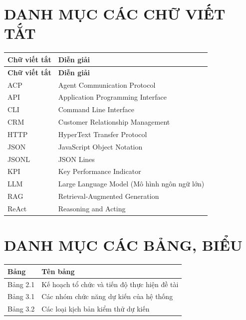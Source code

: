 \documentclass[a4paper]{article}
\begin{document}
\section*{DANH MỤC CÁC CHỮ VIẾT TẮT}
\begin{longtable}{L{0.22\textwidth}L{0.72\textwidth}}
\toprule
\textbf{Chữ viết tắt} & \textbf{Diễn giải}\\
\midrule
\endfirsthead
\toprule
\textbf{Chữ viết tắt} & \textbf{Diễn giải}\\
\midrule
\endhead
ACP & Agent Communication Protocol\\
API & Application Programming Interface\\
CLI & Command Line Interface\\
CRM & Customer Relationship Management\\
HTTP & HyperText Transfer Protocol\\
JSON & JavaScript Object Notation\\
JSONL & JSON Lines\\
KPI & Key Performance Indicator\\
LLM & Large Language Model (Mô hình ngôn ngữ lớn)\\
RAG & Retrieval-Augmented Generation\\
ReAct & Reasoning and Acting\\
\bottomrule
\end{longtable}

\section*{DANH MỤC CÁC BẢNG, BIỂU}
\begin{longtable}{L{0.16\textwidth}L{0.78\textwidth}}
\toprule
\textbf{Bảng} & \textbf{Tên bảng}\\
\midrule
\endhead
Bảng 2.1 & Kế hoạch tổ chức và tiến độ thực hiện đề tài\\
Bảng 3.1 & Các nhóm chức năng dự kiến của hệ thống\\
Bảng 3.2 & Các loại kịch bản kiểm thử dự kiến\\
\bottomrule
\end{longtable}

\clearpage
\tableofcontents
\end{document}
